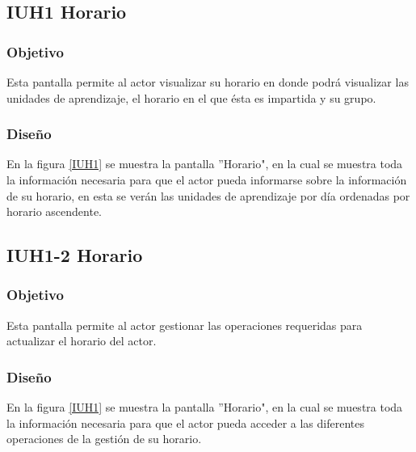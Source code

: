 \subsection{IUH1 Horario}

\subsubsection{Objetivo}

Esta pantalla permite al actor visualizar su horario en donde podrá visualizar las unidades de aprendizaje, el horario en el que ésta es impartida y su grupo.

\subsubsection{Diseño}

En la figura \ref{IUH1} se muestra la pantalla ''Horario", en la cual se muestra toda la información necesaria para que el actor pueda informarse sobre la información de su horario, en esta se verán las unidades de aprendizaje por día ordenadas por horario ascendente.


\subsection{IUH1-2 Horario}

\subsubsection{Objetivo}

Esta pantalla permite al actor gestionar las operaciones requeridas para actualizar el horario del actor.

\subsubsection{Diseño}

En la figura \ref{IUH1} se muestra la pantalla ''Horario", en la cual se muestra toda la información necesaria para que el actor pueda acceder a las diferentes operaciones de la gestión de su horario.

